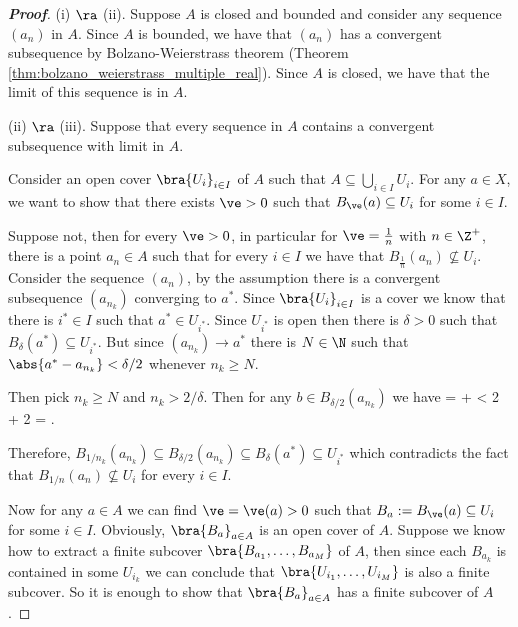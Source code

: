 \begin{proof}[\bf Proof]
\ben
\item [(i)] $\ra$ (ii). Suppose $A$ is closed and bounded and consider any sequence $(a_n)$ in $A$. Since $A$ is bounded, we have that $(a_n)$ has a convergent subsequence by Bolzano-Weierstrass theorem (Theorem \ref{thm:bolzano_weierstrass_multiple_real}). Since $A$ is closed, we have that the limit of this sequence is in $A$.

\item [(ii)] $\ra$ (iii). Suppose that every sequence in $A$ contains a convergent subsequence with limit in $A$. 

Consider an open cover $\bra{U_i}_{i\in I}$ of $A$ such that $A \subseteq \bigcup_{i\in I} U_i$. For any $a\in X$, we want to show that there exists $\ve>0$ such that $B_\ve(a) \subseteq U_i$ for some $i\in I$.

Suppose not, then for every $\ve>0$, in particular for $\ve = \frac 1n$ with $n\in \Z^+$, there is a point $a_n\in A$ such that for every $i\in I$ we have that $B_{\frac 1n}(a_n) \not\subseteq U_i$. Consider the sequence $(a_n)$, by the assumption there is a convergent subsequence $(a_{n_k})$ converging to $a^*$. Since $\bra{U_i}_{i \in I}$ is a cover we know that there is $i^* \in I$ such that $a^* \in U_{i^*}$. Since $U_{i^*}$ is open then there is $\delta >0$ such that $B_{\delta}(a^*) \subseteq U_{i^*}$. But since $(a_{n_k})\to a^*$ there is $N\in \N$ such that $\abs{a^* - a_{n_k}} < \delta/2$ whenever $n_k\geq N$.

Then pick $n_k\geq N$ and $n_k > 2/\delta$. Then for any $b\in B_{\delta/2}(a_{n_k})$ we have
\be
{} =  \leq {} +  < \frac {\delta}2 + \frac{\delta}2 = \delta.
\ee

Therefore, $B_{1/n_k}(a_{n_k}) \subseteq B_{\delta/2} (a_{n_k}) \subseteq B_\delta(a^*) \subseteq U_{i^*}$ which contradicts the fact that $B_{1/n}(a_n) \not\subseteq U_i$ for every $i \in I$.


Now for any $a\in A$ we can find $\ve= \ve(a)>0$ such that $B_a := B_\ve(a) \subseteq U_{i}$ for some $i\in I$. Obviously, $\bra{B_a}_{a\in A}$ is an open cover of $A$. Suppose we know how to extract a finite subcover $\bra{B_{a_1},\dots,B_{a_M}}$ of $A$, then since each $B_{a_k}$ is contained in some $U_{i_k}$ we can conclude that $\bra{U_{i_1},\dots,U_{i_M}}$ is also a finite subcover. So it is enough to show that $\bra{B_{a}}_{a\in A}$ has a finite subcover of $A$.


\end{proof}
